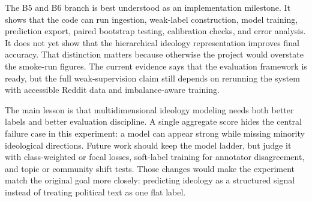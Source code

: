 \documentclass[11pt,twocolumn]{article}
\begin{document}
The B5 and B6 branch is best understood as an implementation milestone. It shows that the code can run ingestion, weak-label construction, model training, prediction export, paired bootstrap testing, calibration checks, and error analysis. It does not yet show that the hierarchical ideology representation improves final accuracy. That distinction matters because otherwise the project would overstate the smoke-run figures. The current evidence says that the evaluation framework is ready, but the full weak-supervision claim still depends on rerunning the system with accessible Reddit data and imbalance-aware training.

The main lesson is that multidimensional ideology modeling needs both better labels and better evaluation discipline. A single aggregate score hides the central failure case in this experiment: a model can appear strong while missing minority ideological directions. Future work should keep the model ladder, but judge it with class-weighted or focal losses, soft-label training for annotator disagreement, and topic or community shift tests. Those changes would make the experiment match the original goal more closely: predicting ideology as a structured signal instead of treating political text as one flat label.
\end{document}
